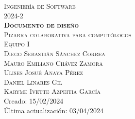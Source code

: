 \thispagestyle{empty}

\begin{center}
    \textsc{\LARGE   Ingeniería de Software \\[5mm]
                    \LARGE 2024-2}      \\[20mm]
    
    \textsc{\textbf{\huge   Documento de diseño }}\\[5mm]
    \textsc{\LARGE  Pizarra colaborativa para computólogos}\\[20mm]

    \LARGE
    \textsc{Equipo I}\\[5mm]
    \Large 
    \textsc{Diego Sebastián Sánchez Correa}\\[2mm]
    \textsc{Mauro Emiliano Chávez Zamora}\\[2mm]
    \textsc{Ulises Josué Anaya Pérez}\\[2mm]
    \textsc{Daniel Linares Gil} \\[2mm]
    \textsc{Karyme Ivette Azpeitia García}
    \\[20mm]

    \large Creado: 15/02/2024\\[2mm]
    \large Última actualización: 03/04/2024\\
    
\end{center}	
\newpage  
